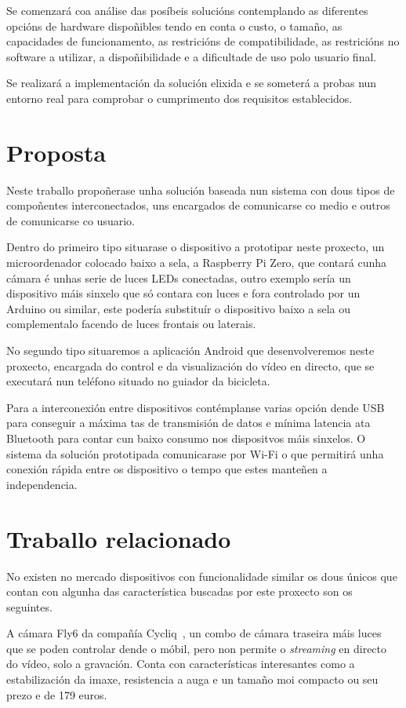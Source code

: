 Se comenzará coa análise das posíbeis solucións contemplando as diferentes opcións de hardware dispoñibles tendo en conta o custo, o tamaño, as capacidades de funcionamento, as restricións de compatibilidade, as restricións no software a utilizar, a dispoñibilidade e a dificultade de uso polo usuario final.

Se realizará a implementación da solución elixida e se someterá a probas nun entorno real para comprobar o cumprimento dos requisitos establecidos.


\section{Proposta}
Neste traballo propoñerase unha solución baseada nun sistema con dous tipos de compoñentes interconectados, uns encargados de comunicarse co medio e outros de comunicarse co usuario.

 Dentro do primeiro tipo situarase o dispositivo a prototipar neste proxecto, un microordenador colocado baixo a sela, a Raspberry Pi Zero, que contará cunha cámara é unhas serie de luces LEDs conectadas, outro exemplo sería un dispositivo máis sinxelo que só contara con luces e fora controlado por un Arduino ou similar, este podería substituír o dispositivo baixo a sela ou complementalo facendo de luces frontais ou laterais.

 No segundo tipo situaremos a aplicación Android que desenvolveremos neste proxecto, encargada do control e da visualización do vídeo en directo, que se executará nun teléfono situado no guiador da bicicleta.

Para a interconexión entre dispositivos contémplanse varias opción dende USB para conseguir a máxima tas de transmisión de datos e mínima latencia ata Bluetooth para contar cun baixo consumo nos dispositvos máis sinxelos. O sistema da solución prototipada comunicarase por Wi-Fi o que permitirá unha conexión rápida entre os dispositivo o tempo que estes manteñen a independencia.

\section{Traballo relacionado}
No existen no mercado dispositivos con funcionalidade similar os dous únicos que contan con algunha das característica buscadas por este proxecto son os seguintes.

 A cámara Fly6 da compañía Cycliq~\cite{Fly6CERear}, un combo de cámara traseira máis luces que se poden controlar dende o móbil, pero non permite o \emph{streaming} en directo do vídeo, solo a gravación. Conta con características interesantes como a estabilización da imaxe, resistencia a auga e un tamaño moi compacto ou seu prezo e de 179 euros.

